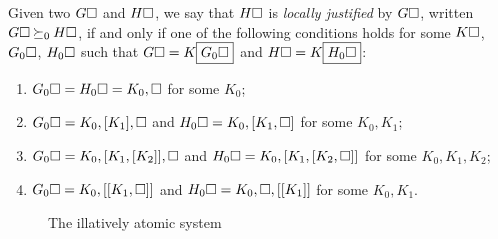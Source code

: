 \begin{scope}
\begin{definition}

  Given two  $G\square$ and $H\square$, we say that $H\square$ is
  \emph{locally justified} by $G\square$, written $G\square \mathbin{\succeq_0} H\square$, if and
  only if one of the following conditions holds for some $K\square$, $G_0\square$,
  $H_0\square$ such that $G\square = K\fbox{$G_0\square$}$ and $H\square =
  K\fbox{$H_0\square$}$:
  \begin{enumerate}
    \item $G_0\square = H_0\square = K_0, \square$ for some $K_0$;
    \item $G_0\square = K_0, [K_1], \square$ and $H_0\square = K_0, [K_1, \square]$ for
    some $K_0, K_1$;
    \item $G_0\square = K_0, [K_1, [K_2]], \square$ and $H_0\square = K_0, [K_1, [K_2,
    \square]]$ for some $K_0, K_1, K_2$;
    \item $G_0\square = K_0, [[K_1, \square]]$ and $H_0\square = K_0, \square, [[K_1]]$
    for some $K_0, K_1$.
  \end{enumerate}
\end{definition}

\begin{figure}
  
  \caption{The illatively atomic system }
\end{figure}


\end{scope}
